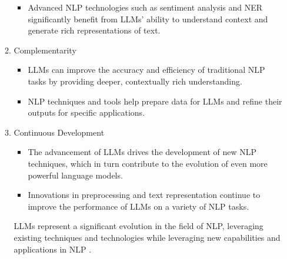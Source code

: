 \begin{enumerate}
\begin{enumerate}
\begin{itemize}
 \item Advanced NLP technologies such as sentiment analysis and NER significantly benefit from LLMs' ability to understand context and generate rich representations of text.
 \end{itemize}
 \item Complementarity
 \begin{itemize}
 \item LLMs can improve the accuracy and efficiency of traditional NLP tasks by providing deeper, contextually rich understanding.
 \item NLP techniques and tools help prepare data for LLMs and refine their outputs for specific applications.
 \end{itemize}
 \item Continuous Development
 \begin{itemize}
 \item The advancement of LLMs drives the development of new NLP techniques, which in turn contribute to the evolution of even more powerful language models.
 \item Innovations in preprocessing and text representation continue to improve the performance of LLMs on a variety of NLP tasks.
 \end{itemize}

LLMs represent a significant evolution in the field of NLP, leveraging existing techniques and technologies while leveraging new capabilities and applications in NLP \cite{Devlin2019,brown2020, Liu2023,lewis2020,raffel2020t5}.
 \end{enumerate}
 \end{enumerate}
\subsubsection{}



